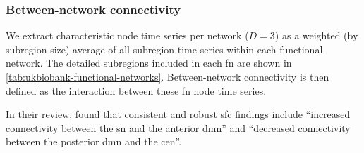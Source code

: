 \subsubsection{Between-network connectivity}

We extract characteristic node time series per network ($D = 3$) as a weighted (by subregion size) average of all subregion time series within each functional network.
The detailed subregions included in each \gls{fn} are shown in \cref{tab:ukbiobank-functional-networks}.
Between-network connectivity is then defined as the interaction between these \gls{fn} node time series.

In their review, \textcite{Mulders2015} found that consistent and robust \gls{sfc} findings include ``increased connectivity between the \gls{sn} and the anterior \gls{dmn}'' and ``decreased connectivity between the posterior \gls{dmn} and the \gls{cen}''.
